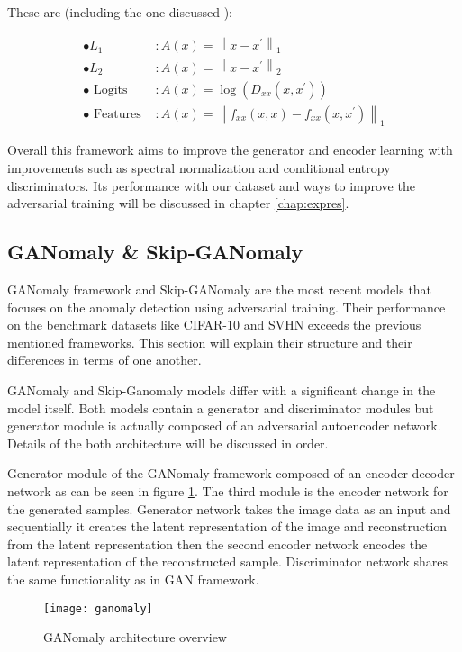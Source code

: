 These are (including the one discussed ):

\begin{equation}
\begin{aligned} \bullet L_{1} & : A(x)=\left\|x-x^{\prime}\right\|_{1} \\ \bullet L_{2} & : A(x)=\left\|x-x^{\prime}\right\|_{2} \\ \bullet \text { Logits } & : A(x)=\log \left(D_{x x}\left(x, x^{\prime}\right)\right) \\ \bullet \text { Features } & : A(x)=\left\|f_{x x}(x, x)-f_{x x}\left(x, x^{\prime}\right)\right\|_{1} \end{aligned}
\end{equation}

Overall this framework aims to improve the generator and encoder learning with improvements such as spectral
normalization and conditional entropy discriminators. Its performance with our dataset and ways to
improve the adversarial training will be discussed in chapter \ref{chap:expres}.

\subsection{GANomaly \& Skip-GANomaly}
\label{sec:ganomaly}

GANomaly framework \cite{Akay2018GANomalySA} and Skip-GANomaly \cite{Akay2019SkipGANomalySC} are the
most recent models that focuses on the anomaly detection using adversarial training. 
Their performance on the benchmark datasets like CIFAR-10
\cite{cifar10} and SVHN \cite{Netzer2011ReadingDI} exceeds the previous mentioned frameworks. This
section will explain their structure and their differences in terms of one another.

GANomaly and Skip-Ganomaly models differ with a significant change in the model itself. Both 
models contain a generator and discriminator modules but generator module is actually composed of an
adversarial autoencoder network. Details of the both architecture will be discussed in order.

Generator module of the GANomaly framework composed of an encoder-decoder network as can be seen in
figure \ref{fig:ganomaly_model}. The third module is the encoder network for the generated samples.
Generator network takes the image data as an input and sequentially it creates the latent
representation of the image and reconstruction from the latent representation then the second
encoder network encodes the latent representation of the reconstructed sample. Discriminator network
shares the same functionality as in GAN framework. \cite{Goodfellow:2014:GAN:2969033.2969125}
\begin{figure}[h!]
	\centering
	\texttt{[image: ganomaly]}
    \caption{GANomaly architecture overview}
    \label{fig:ganomaly_model}
\end{figure}

